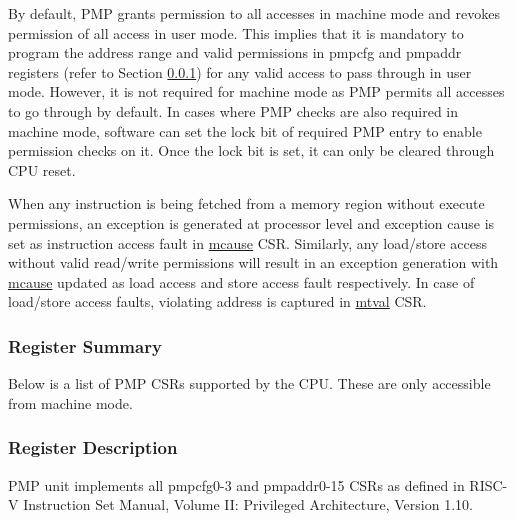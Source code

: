 \documentclass[main\_\_EN.tex]{subfiles}
\begin{document}
By default, PMP grants permission to all accesses in machine mode and revokes permission of all access in user mode. This implies that it is mandatory to program the address range and valid permissions in pmpcfg and pmpaddr registers (refer to Section \ref{sec:riscvcpu-pmp-reg-summ}) for any valid access to pass through in user mode. However, it is not required for machine mode as PMP permits all accesses to go through by default. In cases where PMP checks are also required in machine mode, software can set the lock bit of required PMP entry to enable permission checks on it. Once the lock bit is set, it can only be cleared through CPU reset.

When any instruction is being fetched from a memory region without execute permissions, an exception is generated at processor level and exception cause is set as instruction access fault in \hyperref[regdesc:MCAUSE]{mcause} CSR. Similarly, any load/store access without valid read/write permissions will result in an exception generation with \hyperref[regdesc:MCAUSE]{mcause} updated as load access and store access fault respectively. In case of load/store access faults, violating address is captured in \hyperref[regdesc:MTVAL]{mtval} CSR.


\newpage
\hypertarget{riscvcpu-pmp-reg-summ}{}
\subsubsection{Register Summary}
\label{sec:riscvcpu-pmp-reg-summ}

Below is a list of PMP CSRs supported by the CPU. These are only accessible from machine mode.




\subsubsection{Register Description}
\label{sec:riscvcpu-pmp-reg-desc}

PMP unit implements all pmpcfg0-3 and pmpaddr0-15 CSRs as defined in RISC-V Instruction Set Manual, Volume II: Privileged Architecture, Version 1.10.



\end{document}
